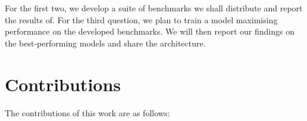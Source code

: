 For the first two, we develop a suite of benchmarks we shall distribute and report the results of. 
For the third question, we plan to train a model maximising performance on the developed benchmarks. We will then report our findings on the best-performing models and share the architecture.

\section{Contributions}

The contributions of this work are as follows:

